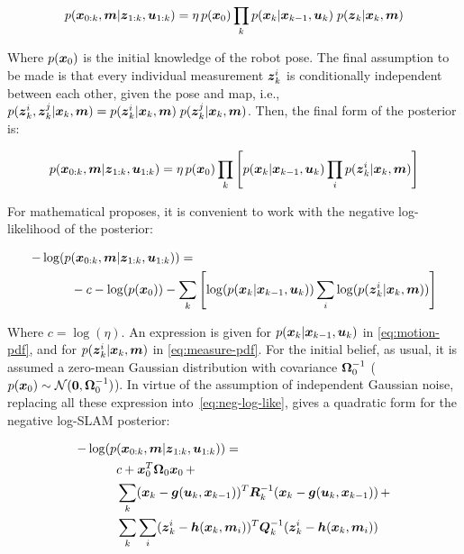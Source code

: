 \begin{equation}
p(\boldsymbol{x}_{0:k},\boldsymbol{m}|\boldsymbol{z}_{1:k},\boldsymbol{u}_{1:k}) = 
\eta\, p(\boldsymbol{x}_0) \prod_{k} p(\boldsymbol{x}_k|\boldsymbol{x}_{k-1},\boldsymbol{u}_k)\;p(\boldsymbol{z}_k|\boldsymbol{x}_k,\boldsymbol{m})
\end{equation}

Where $p(\boldsymbol{x}_0)$ is the initial knowledge of the robot pose. The final assumption to be made is that every individual measurement $\boldsymbol{z}_k^i$ is conditionally independent between each other, given the pose and map, i.e., $p(\boldsymbol{z}_k^i,\boldsymbol{z}_k^j|\boldsymbol{x}_k,\boldsymbol{m}) = p(\boldsymbol{z}_k^i|\boldsymbol{x}_k,\boldsymbol{m})\; p(\boldsymbol{z}_k^j|\boldsymbol{x}_k,\boldsymbol{m})$. Then, the final form of the posterior is: 
  
\begin{equation}
p(\boldsymbol{x}_{0:k},\boldsymbol{m}|\boldsymbol{z}_{1:k},\boldsymbol{u}_{1:k}) = 
\eta\, p(\boldsymbol{x}_0) \prod_{k}\left[ p(\boldsymbol{x}_k|\boldsymbol{x}_{k-1},\boldsymbol{u}_k)\prod_{i}p(\boldsymbol{z}_k^i|\boldsymbol{x}_k,\boldsymbol{m})\right] 
\label{eq:posterior}
\end{equation} 

\noindent 
For mathematical proposes, it is convenient to work with the negative log-likelihood of the posterior:

\begin{equation}
\begin{split}
-\log(p&(\boldsymbol{x}_{0:k},\boldsymbol{m}|\boldsymbol{z}_{1:k},\boldsymbol{u}_{1:k})) =\\ 
&-c - \log(p(\boldsymbol{x}_0)) - \sum_{k}\left[ \log(p(\boldsymbol{x}_k|\boldsymbol{x}_{k-1},\boldsymbol{u}_k))\sum_{i}\log(p(\boldsymbol{z}_k^i|\boldsymbol{x}_k,\boldsymbol{m}))\right] 
\end{split}
\label{eq:neg-log-like}
\end{equation}

Where $c=\log(\eta)$. An expression is given for $p(\boldsymbol{x}_k|\boldsymbol{x}_{k-1},\boldsymbol{u}_k)$ in \eqref{eq:motion-pdf}, and for $p(\boldsymbol{z}_k^i|\boldsymbol{x}_k,\boldsymbol{m})$ in \eqref{eq:measure-pdf}. For the initial belief, as usual, it is assumed a zero-mean Gaussian distribution with covariance $\boldsymbol{\Omega}_0^{-1}$ ($p(\boldsymbol{x}_0)\sim\mathcal{N}(\boldsymbol{0},\boldsymbol{\Omega}_0^{-1})$). In virtue of the assumption of independent Gaussian noise, replacing all these expression into~\eqref{eq:neg-log-like}, gives a quadratic form for the negative log-SLAM posterior:

\begin{equation}
\begin{split}
-\log(p&(\boldsymbol{x}_{0:k},\boldsymbol{m}|\boldsymbol{z}_{1:k},\boldsymbol{u}_{1:k})) =\\ 
&c+\boldsymbol{x}_0^T \boldsymbol{\Omega}_0 \boldsymbol{x}_0\,+\\
&\sum_{k} (\boldsymbol{x}_k-\boldsymbol{g}(\boldsymbol{u}_k,\boldsymbol{x}_{k-1}))^T
\boldsymbol{R}_k^{-1}(\boldsymbol{x}_k-\boldsymbol{g}(\boldsymbol{u}_k,\boldsymbol{x}_{k-1}))\,+\\
&\sum_{k}\sum_{i}(\boldsymbol{z}_k^i-\boldsymbol{h}(\boldsymbol{x}_k,\boldsymbol{m}_i))^T
\boldsymbol{Q}_k^{-1}(\boldsymbol{z}_k^i-\boldsymbol{h}(\boldsymbol{x}_k,\boldsymbol{m}_i))
\label{eq:quadratic}
\end{split}
\end{equation}

